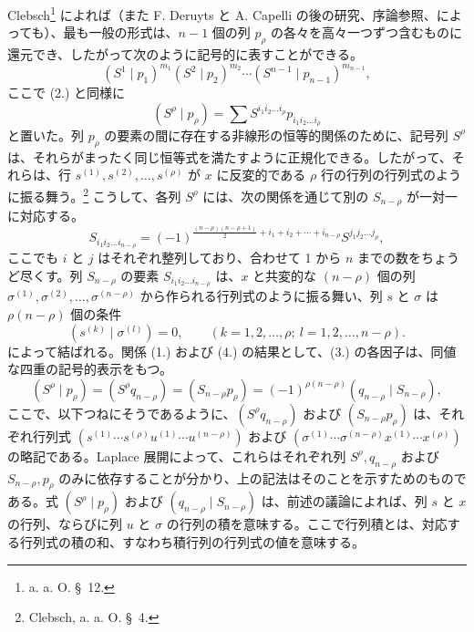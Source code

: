\documentclass[11pt]{jlreq}
\begin{document}
Clebsch\footnote{a. a. O. \S\ 12.} によれば（また F. Deruyts と A. Capelli の後の研究、序論参照、によっても）、最も一般の形式は、$n-1$ 個の列 $p_\rho$ の各々を高々一つずつ含むものに還元でき、したがって次のように記号的に表すことができる。
\begin{equation}
 (S^1\mid p_1)^{m_1}(S^2\mid p_2)^{m_2}\cdots(S^{n-1}\mid p_{n-1})^{m_{n-1}},
\tag{3}
\end{equation}
ここで (2.) と同様に
\[
 (S^\rho\mid p_\rho)=\sum S^{i_1i_2\ldots i_\rho}p_{i_1i_2\ldots i_\rho}
\]
と置いた。列 $p_\rho$ の要素の間に存在する非線形の恒等的関係のために、記号列 $S^\rho$ は、それらがまったく同じ恒等式を満たすように正規化できる。したがって、それらは、行 $s^{(1)},s^{(2)},\ldots,s^{(\rho)}$ が $x$ に反変的である $\rho$ 行の行列の行列式のように振る舞う。\footnote{Clebsch, a. a. O. \S\ 4.} こうして、各列 $S^\rho$ には、次の関係を通じて別の $S_{n-\rho}$ が一対一に対応する。
\begin{equation}
 S_{i_1i_2\ldots i_{n-\rho}}=(-1)^{\frac{(n-\rho)(n-\rho+1)}2+i_1+i_2+\cdots+i_{n-\rho}}S^{j_1j_2\ldots j_\rho},
\tag{4}
\end{equation}
ここでも $i$ と $j$ はそれぞれ整列しており、合わせて 1 から $n$ までの数をちょうど尽くす。列 $S_{n-\rho}$ の要素 $S_{i_1i_2\ldots i_{n-\rho}}$ は、$x$ と共変的な $(n-\rho)$ 個の列 $\sigma^{(1)},\sigma^{(2)},\ldots,\sigma^{(n-\rho)}$ から作られる行列式のように振る舞い、列 $s$ と $\sigma$ は $\rho(n-\rho)$ 個の条件
\begin{equation}
 (s^{(k)}\mid \sigma^{(l)})=0,\qquad(k=1,2,\ldots,\rho;\ l=1,2,\ldots,n-\rho).
\tag{5}
\end{equation}
によって結ばれる。関係 (1.) および (4.) の結果として、(3.) の各因子は、同値な四重の記号的表示をもつ。
\begin{equation}
 (S^\rho\mid p_\rho)=(S^\rho q_{n-\rho})=(S_{n-\rho}p_\rho)=(-1)^{\rho(n-\rho)}(q_{n-\rho}\mid S_{n-\rho}),
\tag{6}
\end{equation}
ここで、以下つねにそうであるように、$(S^\rho q_{n-\rho})$ および $(S_{n-\rho}p_\rho)$ は、それぞれ行列式 $(s^{(1)}\cdots s^{(\rho)}u^{(1)}\cdots u^{(n-\rho)})$ および $(\sigma^{(1)}\cdots\sigma^{(n-\rho)}x^{(1)}\cdots x^{(\rho)})$ の略記である。Laplace 展開によって、これらはそれぞれ列 $S^\rho,q_{n-\rho}$ および $S_{n-\rho},p_\rho$ のみに依存することが分かり、上の記法はそのことを示すためのものである。式 $(S^\rho\mid p_\rho)$ および $(q_{n-\rho}\mid S_{n-\rho})$ は、前述の議論によれば、列 $s$ と $x$ の行列、ならびに列 $u$ と $\sigma$ の行列の積を意味する。ここで行列積とは、対応する行列式の積の和、すなわち積行列の行列式の値を意味する。
\end{document}

